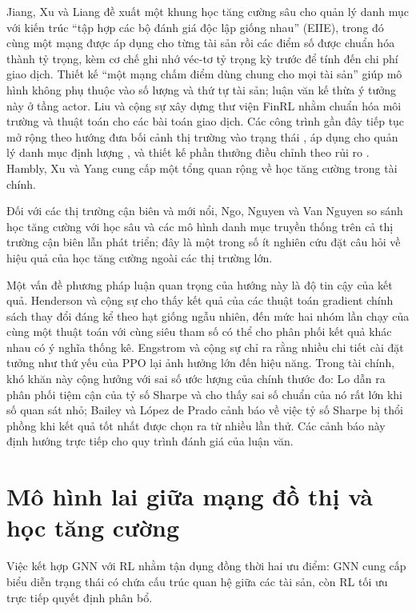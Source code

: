 Jiang, Xu và Liang \cite{jiang2017} đề xuất một khung học tăng cường sâu cho quản lý danh mục với kiến trúc ``tập hợp các bộ đánh giá độc lập giống nhau'' (EIIE), trong đó cùng một mạng được áp dụng cho từng tài sản rồi các điểm số được chuẩn hóa thành tỷ trọng, kèm cơ chế ghi nhớ véc-tơ tỷ trọng kỳ trước để tính đến chi phí giao dịch. Thiết kế ``một mạng chấm điểm dùng chung cho mọi tài sản'' giúp mô hình không phụ thuộc vào số lượng và thứ tự tài sản; luận văn kế thừa ý tưởng này ở tầng actor. Liu và cộng sự \cite{liu2020finrl} xây dựng thư viện FinRL nhằm chuẩn hóa môi trường và thuật toán cho các bài toán giao dịch. Các công trình gần đây tiếp tục mở rộng theo hướng đưa bối cảnh thị trường vào trạng thái \cite{yang2023}, áp dụng cho quản lý danh mục định lượng \cite{wei2023}, và thiết kế phần thưởng điều chỉnh theo rủi ro \cite{choudhary2025}. Hambly, Xu và Yang \cite{hambly2023} cung cấp một tổng quan rộng về học tăng cường trong tài chính.

Đối với các thị trường cận biên và mới nổi, Ngo, Nguyen và Van Nguyen \cite{ngo2023} so sánh học tăng cường với học sâu và các mô hình danh mục truyền thống trên cả thị trường cận biên lẫn phát triển; đây là một trong số ít nghiên cứu đặt câu hỏi về hiệu quả của học tăng cường ngoài các thị trường lớn.

Một vấn đề phương pháp luận quan trọng của hướng này là độ tin cậy của kết quả. Henderson và cộng sự \cite{henderson2018} cho thấy kết quả của các thuật toán gradient chính sách thay đổi đáng kể theo hạt giống ngẫu nhiên, đến mức hai nhóm lần chạy của cùng một thuật toán với cùng siêu tham số có thể cho phân phối kết quả khác nhau có ý nghĩa thống kê. Engstrom và cộng sự \cite{engstrom2020} chỉ ra rằng nhiều chi tiết cài đặt tưởng như thứ yếu của PPO lại ảnh hưởng lớn đến hiệu năng. Trong tài chính, khó khăn này cộng hưởng với sai số ước lượng của chính thước đo: Lo \cite{lo2002} dẫn ra phân phối tiệm cận của tỷ số Sharpe và cho thấy sai số chuẩn của nó rất lớn khi số quan sát nhỏ; Bailey và López de Prado \cite{bailey2014} cảnh báo về việc tỷ số Sharpe bị thổi phồng khi kết quả tốt nhất được chọn ra từ nhiều lần thử. Các cảnh báo này định hướng trực tiếp cho quy trình đánh giá của luận văn.

\section{Mô hình lai giữa mạng đồ thị và học tăng cường}

Việc kết hợp GNN với RL nhằm tận dụng đồng thời hai ưu điểm: GNN cung cấp biểu diễn trạng thái có chứa cấu trúc quan hệ giữa các tài sản, còn RL tối ưu trực tiếp quyết định phân bổ.


